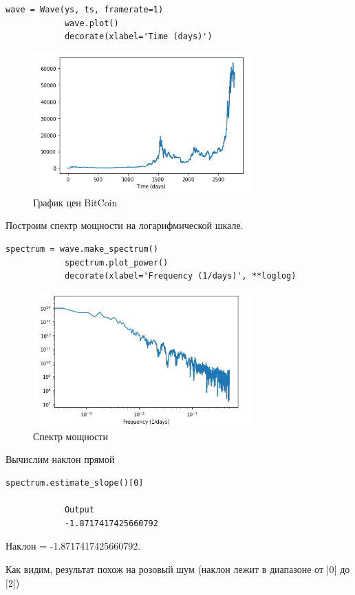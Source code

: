 \documentclass[a4paper,12pt]{article}
\begin{document}
\begin{enumerate}
\begin{lstlisting}[caption=Построение графика цен BitCoin]
			wave = Wave(ys, ts, framerate=1)
			wave.plot()
			decorate(xlabel='Time (days)')
		\end{lstlisting}
		\begin{figure}[H]
			\centering
			\includegraphics[width=0.75\textwidth]{3_2.png}
			\caption{График цен BitCoin}
			\label{fig:3.2}
		\end{figure}
		
		Построим спектр мощности на логарифмической шкале.
		\begin{lstlisting}[caption=Спектр мощности]
			spectrum = wave.make_spectrum()
			spectrum.plot_power()
			decorate(xlabel='Frequency (1/days)', **loglog)
		\end{lstlisting}
		\begin{figure}[H]
			\centering
			\includegraphics[width=0.75\textwidth]{3_3.png}
			\caption{Спектр мощности}
			\label{fig:3.3}
		\end{figure}
		
		Вычислим наклон прямой
		\begin{lstlisting}[caption=Спектр мощности]
			spectrum.estimate_slope()[0]
			
			Output
			-1.8717417425660792
		\end{lstlisting}
		
		Наклон = -1.8717417425660792.
		
		Как видим, результат похож на розовый шум (наклон лежит в диапазоне от |0| до |2|)
		
	\end{enumerate}
	\newpage
\end{document}
